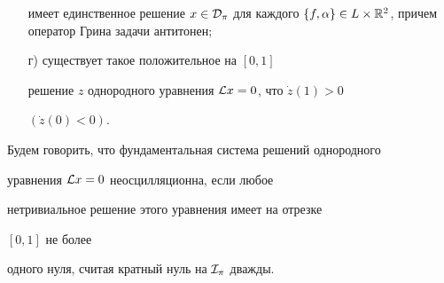 \begin{thm}
\begin{itemize}
имеет единственное решение $x\in\Dp$ для каждого $\{f,\a\}\in


L\times\R^2$, причем оператор Грина задачи антитонен$;$


\item[г)] существует такое положительное на $[0,1]$


решение $z$ однородного уравнения ${\cal L} x=0$, что $\Dot z(1)>0$


$(\Dot z(0)<0)$.


\end{itemize}


\end{thm}





\begin{defn}


Будем говорить, что фундаментальная система решений однородного


уравнения ${\cal L} x=0$ неосцилляционна, если любое


нетривиальное решение этого уравнения имеет на отрезке


$[0,1]$ не более


одного нуля, считая кратный нуль на ${\cal I}_\pi$ дважды.


\end{defn}





